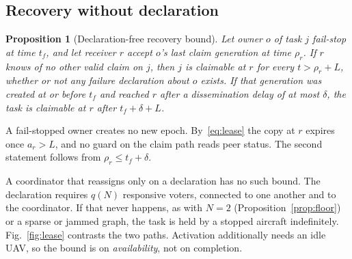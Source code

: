\documentclass[conference]{IEEEtran}
\newtheorem{proposition}{Proposition}
\begin{document}
\subsection{Recovery without declaration}
\label{sec:recovery}

\begin{proposition}[Declaration-free recovery bound]
\label{prop:recovery}
Let owner $o$ of task $j$ fail-stop at time $t_f$, and let receiver $r$
accept $o$'s last claim generation at time $\rho_r$. If $r$ knows of no other
valid claim on $j$, then $j$ is claimable at $r$ for every $t>\rho_r+L$,
whether or not any failure declaration about $o$ exists. If that generation
was created at or before $t_f$ and reached $r$ after a dissemination delay of
at most $\delta$, the task is claimable at $r$ after
$t_f+\delta+L$.
\end{proposition}
\begin{IEEEproof}
A fail-stopped owner creates no new epoch. By~\eqref{eq:lease} the copy at $r$
expires once $a_r>L$, and no guard on the claim path reads peer status. The
second statement follows from $\rho_r\le t_f+\delta$.
\end{IEEEproof}

A coordinator that reassigns only on a declaration has no such bound. The
declaration requires $q(N)$ responsive voters, connected to one another and to
the coordinator. If that never happens, as with $N=2$ (Proposition~\ref{prop:floor})
or a sparse or jammed graph, the task is held by a stopped aircraft
indefinitely.
Fig.~\ref{fig:lease} contrasts the two paths. Activation additionally needs an
idle UAV, so the bound is on \emph{availability}, not on completion.
\end{document}
